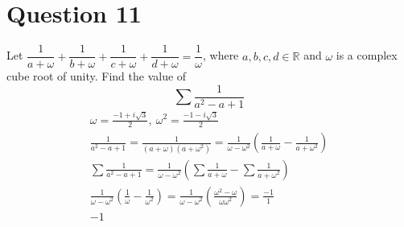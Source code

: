 \documentclass[12pt]{article}
\begin{document}
\section{Question 11}
Let $\dfrac{1}{a+\omega }+\dfrac{1}{b+\omega }+\dfrac{1}{c+\omega }+\dfrac{1}{d+\omega }=\dfrac{1}{\omega}$, where $a,b,c,d \in \mathbb{R}$ and $\omega$ is a complex cube root of unity. 
Find the value of
\[
\sum\frac{1}{a^2-a+1}
\]
\begin{gather*}
    \omega = \frac{-1+i\sqrt{3}}{2}, \ \omega^2=\frac{-1-i\sqrt{3}}{2}\\
    \frac{1}{a^2-a+1}=\frac{1}{(a+\omega)(a+\omega^2)}=\frac{1}{\omega-\omega^2}(\frac{1}{a+\omega}-\frac{1}{a+\omega^2})\\
    \sum\frac{1}{a^2-a+1}=\frac{1}{\omega-\omega^2}(\sum \frac{1}{a+\omega}-\sum \frac{1}{a+\omega^2})\\
    \frac{1}{\omega-\omega^2}(\frac{1}{\omega}-\frac{1}{\omega^2})=\frac{1}{\omega-\omega^2}(\frac{\omega^2-\omega}{\omega  \omega^2})=\frac{-1}{1}\\
    \boxed{-1}
\end{gather*}
\end{document}
